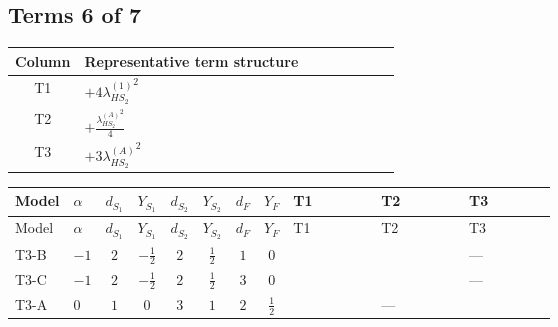 \documentclass[8pt]{article}
\begin{document}
\begin{landscape}
\subsection*{Terms 6 of 7}
\begin{center}
\begin{tabular}{@{}c >{\raggedright\arraybackslash}p{0.82\linewidth}@{}}
\toprule
Column & Representative term structure \\
\midrule
T1 & \(\displaystyle +4 {\lambda_{HS_2}^{(1)}}^2\) \\
\midrule
T2 & \(\displaystyle +\frac{{\lambda_{HS_2}^{(A)}}^2}{4}\) \\
\midrule
T3 & \(\displaystyle +3 {\lambda_{HS_2}^{(A)}}^2\) \\
\midrule
\bottomrule
\end{tabular}
\end{center}
\smallskip
\tiny
\begin{longtable}{@{}llcccccc >{\raggedright\arraybackslash}p{0.21\linewidth} >{\raggedright\arraybackslash}p{0.21\linewidth} >{\raggedright\arraybackslash}p{0.21\linewidth}@{}}
\toprule
Model & $\alpha$ & $d_{S_1}$ & $Y_{S_1}$ & $d_{S_2}$ & $Y_{S_2}$ & $d_F$ & $Y_F$ & T1 & T2 & T3 \\
\midrule
\endfirsthead
\toprule
Model & $\alpha$ & $d_{S_1}$ & $Y_{S_1}$ & $d_{S_2}$ & $Y_{S_2}$ & $d_F$ & $Y_F$ & T1 & T2 & T3 \\
\midrule
\endhead
T3-B & $-1$ & $2$ & $-\frac{1}{2}$ & $2$ & $\frac{1}{2}$ & $1$ & $0$ & \scriptsize\adjustbox{max width=\linewidth}{$\begin{gathered} +4 {\lambda_{HS_2}^{(1)}}^2\end{gathered}$} & \scriptsize\adjustbox{max width=\linewidth}{$\begin{gathered} +\frac{{\lambda_{HS_2}^{(A)}}^2}{4}\end{gathered}$} & --- \\
\midrule
T3-C & $-1$ & $2$ & $-\frac{1}{2}$ & $2$ & $\frac{1}{2}$ & $3$ & $0$ & \scriptsize\adjustbox{max width=\linewidth}{$\begin{gathered} +4 {\lambda_{HS_2}^{(1)}}^2\end{gathered}$} & \scriptsize\adjustbox{max width=\linewidth}{$\begin{gathered} +\frac{{\lambda_{HS_2}^{(A)}}^2}{4}\end{gathered}$} & --- \\
\midrule
T3-A & $0$ & $1$ & $0$ & $3$ & $1$ & $2$ & $\frac{1}{2}$ & \scriptsize\adjustbox{max width=\linewidth}{$\begin{gathered} +6 {\lambda_{HS_2}^{(1)}}^2\end{gathered}$} & --- & \scriptsize\adjustbox{max width=\linewidth}{$\begin{gathered} +3 {\lambda_{HS_2}^{(A)}}^2\end{gathered}$} \\

\end{longtable}
\end{landscape}
\end{document}
